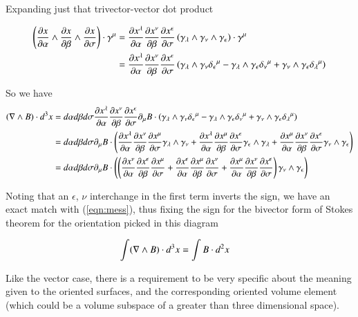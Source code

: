 Expanding just that trivector-vector dot product

\begin{align*}
\left( \frac{\partial {x}}{\partial {\alpha}} \wedge \frac{\partial {x}}{\partial {\beta}} \wedge \frac{\partial {x}}{\partial {\sigma}} \right) \cdot \gamma^\mu 
&=
\frac{\partial {x^\lambda}}{\partial {\alpha}} \frac{\partial {x^\nu}}{\partial {\beta}} \frac{\partial {x^\epsilon}}{\partial {\sigma}} \left( \gamma_\lambda \wedge \gamma_\nu \wedge \gamma_\epsilon \right) \cdot \gamma^\mu  \\
&=
\frac{\partial {x^\lambda}}{\partial {\alpha}} \frac{\partial {x^\nu}}{\partial {\beta}} \frac{\partial {x^\epsilon}}{\partial {\sigma}} \left( 
\gamma_\lambda \wedge \gamma_\nu {\delta_\epsilon}^\mu
-\gamma_\lambda \wedge \gamma_\epsilon {\delta_\nu}^\mu
+\gamma_\nu \wedge \gamma_\epsilon {\delta_\lambda}^\mu
\right) 
\end{align*}

So we have
\begin{align*}
(\nabla \wedge B) \cdot d^3 x
&=
d\alpha d\beta d\sigma \frac{\partial {x^\lambda}}{\partial {\alpha}} \frac{\partial {x^\nu}}{\partial {\beta}} \frac{\partial {x^\epsilon}}{\partial {\sigma}} \partial_\mu B \cdot \left( 
\gamma_\lambda \wedge \gamma_\nu {\delta_\epsilon}^\mu
-\gamma_\lambda \wedge \gamma_\epsilon {\delta_\nu}^\mu
+\gamma_\nu \wedge \gamma_\epsilon {\delta_\lambda}^\mu
\right) 
\\
&=
d\alpha d\beta d\sigma 
\partial_\mu B \cdot \left( 
  \frac{\partial {x^\lambda}}{\partial {\alpha}} \frac{\partial {x^\nu}}{\partial {\beta}} \frac{\partial {x^\mu}}{\partial {\sigma}} \gamma_\lambda \wedge \gamma_\nu 
+ \frac{\partial {x^\lambda}}{\partial {\alpha}} \frac{\partial {x^\mu}}{\partial {\beta}} \frac{\partial {x^\epsilon}}{\partial {\sigma}} \gamma_\epsilon \wedge \gamma_\lambda 
+ \frac{\partial {x^\mu}}{\partial {\alpha}} \frac{\partial {x^\nu}}{\partial {\beta}} \frac{\partial {x^\epsilon}}{\partial {\sigma}} \gamma_\nu \wedge \gamma_\epsilon 
\right) 
\\
&=
d\alpha d\beta d\sigma 
\partial_\mu B \cdot 
\left( 
\left( 
  \frac{\partial {x^\nu}}{\partial {\alpha}} \frac{\partial {x^\epsilon}}{\partial {\beta}} \frac{\partial {x^\mu}}{\partial {\sigma}} 
+ \frac{\partial {x^\epsilon}}{\partial {\alpha}} \frac{\partial {x^\mu}}{\partial {\beta}} \frac{\partial {x^\nu}}{\partial {\sigma}} 
+ \frac{\partial {x^\mu}}{\partial {\alpha}} \frac{\partial {x^\nu}}{\partial {\beta}} \frac{\partial {x^\epsilon}}{\partial {\sigma}} 
\right) 
\gamma_\nu \wedge \gamma_\epsilon 
\right) 
\\
\end{align*}

Noting that an $\epsilon$, $\nu$ interchange in the first term inverts the sign, we have an exact match with (\ref{eqn:mess}), thus fixing the sign for the
bivector form of Stokes theorem for the orientation picked in this diagram

\begin{align}
\int (\nabla \wedge B) \cdot d^3 x &= \int B \cdot d^2 x
\end{align}

Like the vector case, there is a requirement to be very specific about the meaning given to the oriented surfaces, and the corresponding oriented volume element (which could be a volume subspace of a greater than three dimensional space).

\EndNoBibArticle

